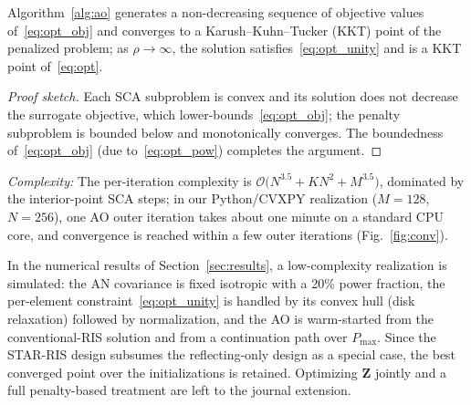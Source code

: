 \begin{theorem}[Convergence]
Algorithm~\ref{alg:ao} generates a non-decreasing sequence of objective values of~\eqref{eq:opt_obj} and converges to a Karush--Kuhn--Tucker (KKT) point of the penalized problem; as $\rho \to \infty$, the solution satisfies~\eqref{eq:opt_unity} and is a KKT point of~\eqref{eq:opt}.
\end{theorem}
\begin{proof}[Proof sketch]
Each SCA subproblem is convex and its solution does not decrease the surrogate objective, which lower-bounds~\eqref{eq:opt_obj}; the penalty subproblem is bounded below and monotonically converges. The boundedness of~\eqref{eq:opt_obj} (due to~\eqref{eq:opt_pow}) completes the argument.
\end{proof}

\emph{Complexity:} The per-iteration complexity is $\mathcal{O}\big(N^{3.5} + K N^2 + M^{3.5}\big)$, dominated by the interior-point SCA steps; in our Python/CVXPY realization ($M=128$, $N=256$), one AO outer iteration takes about one minute on a standard CPU core, and convergence is reached within a few outer iterations (Fig.~\ref{fig:conv}).

\begin{remark}
In the numerical results of Section~\ref{sec:results}, a low-complexity realization is simulated: the AN covariance is fixed isotropic with a 20\% power fraction, the per-element constraint~\eqref{eq:opt_unity} is handled by its convex hull (disk relaxation) followed by normalization, and the AO is warm-started from the conventional-RIS solution and from a continuation path over $P_{\max}$. Since the STAR-RIS design subsumes the reflecting-only design as a special case, the best converged point over the initializations is retained. Optimizing $\mathbf{Z}$ jointly and a full penalty-based treatment are left to the journal extension.
\end{remark}
